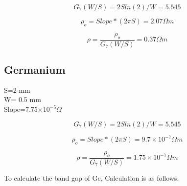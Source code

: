 \documentclass[a4paper, amsfonts, amssymb, amsmath, reprint, showkeys, nofootinbib, twoside]{revtex4-1}
\begin{document}
\begin{equation}
	G_7(W/S)=2Sln(2)/W=5.545
\end{equation}

\begin{equation}
	\rho_o=Slope*(2\pi S)=2.07 \Omega m
\end{equation}

\begin{equation}
	\rho=\frac{\rho_o}{G_7(W/S)}=0.37 \Omega m
\end{equation}

\subsection{Germanium}
\begin{center}
	S=2 mm\\W= 0.5 mm\\Slope=7.75$\times10^{-5 }\Omega$
\end{center}

\begin{equation}
	G_7(W/S)=2Sln(2)/W=5.545
\end{equation}

\begin{equation}
	\rho_o=Slope*(2\pi S)=9.7\times10^{-7} \Omega m
\end{equation}

\begin{equation}
	\rho=\frac{\rho_o}{G_7(W/S)}= 1.75\times10^{-7}\Omega m
\end{equation}

To calculate the band gap of Ge, Calculation is as follows:
\end{document}
